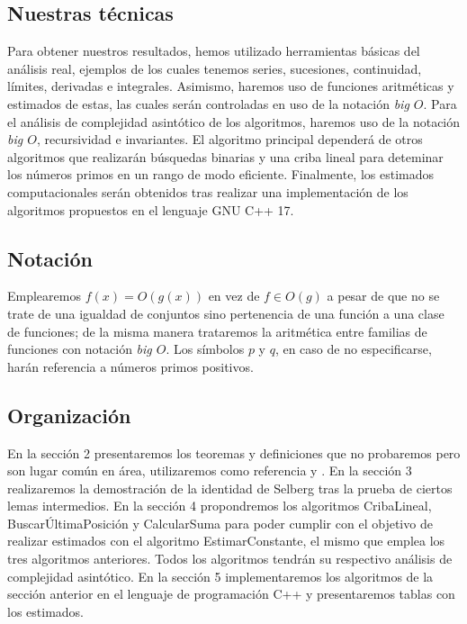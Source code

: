 \documentclass[10pt]{article}
\theoremstyle{definition}
\theoremstyle{remark}
\begin{document}
\subsection{Nuestras t\'ecnicas}
Para obtener nuestros resultados, hemos utilizado herramientas b\'asicas del
an\'alisis real, ejemplos de los cuales tenemos series, sucesiones, continuidad,
l\'imites, derivadas e integrales. 
Asimismo, haremos uso de funciones aritm\'eticas
y estimados de estas, las cuales ser\'an controladas en uso de la notaci\'on {\it big $O$}.
Para el an\'alisis de complejidad asint\'otico de los algoritmos,
haremos uso de la notaci\'on {\it big $O$}, recursividad e invariantes.
El algoritmo principal depender\'a de otros algoritmos que realizar\'an
b\'usquedas binarias y una criba lineal para deteminar los n\'umeros primos en un rango de modo eficiente.
Finalmente, los estimados computacionales ser\'an obtenidos tras realizar una
implementaci\'on de los algoritmos propuestos en el lenguaje GNU C++ 17.

\subsection{Notaci\'on}
Emplearemos $f(x) = O(g(x))$ en vez de $f \in O(g)$
a pesar de que no se trate de una igualdad de conjuntos sino
pertenencia de una funci\'on a una clase de funciones; 
de la misma manera
trataremos la aritm\'etica entre familias de funciones con notaci\'on {\it big $O$}.
Los s\'imbolos $p$ y $q$, en caso de no especificarse,
har\'an referencia a n\'umeros primos positivos.

\subsection{Organizaci\'on}
En la secci\'on 2 presentaremos los teoremas y definiciones que no probaremos pero 
son lugar com\'un en \'area, utilizaremos como referencia \cite{Apostol} y \cite{CLRS}.
En la secci\'on 3 realizaremos la demostraci\'on de la identidad de Selberg tras la prueba de ciertos lemas intermedios.
En la secci\'on 4 propondremos los algoritmos CribaLineal, Buscar\'UltimaPosici\'on y CalcularSuma 
para poder cumplir con el objetivo de realizar estimados con el algoritmo EstimarConstante, el mismo que emplea los tres algoritmos anteriores. 
Todos los algoritmos tendr\'an su respectivo an\'alisis de complejidad asint\'otico.
En la secci\'on 5 implementaremos los algoritmos de la secci\'on anterior en el lenguaje de programaci\'on C++ y
presentaremos tablas con los estimados.
\end{document}
